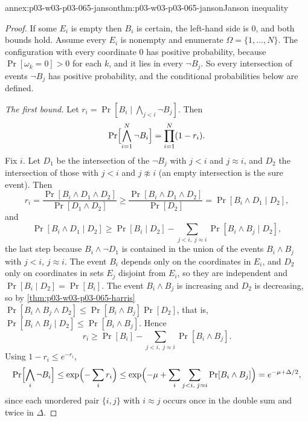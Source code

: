 \begin{annexitem}{annex:p03-w03-p03-065-janson}{thm:p03-w03-p03-065-janson}{Janson inequality}
\begin{proof}
If some \(E_i\) is empty then \(B_i\) is certain, the left-hand side is
\(0\), and both bounds hold.  Assume every \(E_i\) is nonempty and enumerate
\(\Omega=\{1,\ldots,N\}\).  The configuration with every coordinate \(0\)
has positive probability, because \(\Pr[\omega_k=0]>0\) for each \(k\), and
it lies in every \(\neg B_j\).  So every intersection of events \(\neg B_j\)
has positive probability, and the conditional probabilities below are
defined.

\emph{The first bound.}  Let \(r_i=\Pr[B_i\mid\bigwedge_{j<i}\neg B_j]\).
Then
\[
  \Pr\Bigl[\bigwedge_{i=1}^N\neg B_i\Bigr]=\prod_{i=1}^N(1-r_i).
\]
Fix \(i\).  Let \(D_1\) be the intersection of the \(\neg B_j\) with
\(j<i\) and \(j\approx i\), and \(D_2\) the intersection of those with \(j<i\)
and \(j\not\approx i\) (an empty intersection is the sure event).  Then
\[
  r_i=\frac{\Pr[B_i\wedge D_1\wedge D_2]}{\Pr[D_1\wedge D_2]}
  \geq\frac{\Pr[B_i\wedge D_1\wedge D_2]}{\Pr[D_2]}
  =\Pr[B_i\wedge D_1\mid D_2],
\]
and
\[
  \Pr[B_i\wedge D_1\mid D_2]
  \geq\Pr[B_i\mid D_2]-\sum_{j<i,\;j\approx i}\Pr[B_i\wedge B_j\mid D_2],
\]
the last step because \(B_i\wedge\neg D_1\) is contained in the union of the
events \(B_i\wedge B_j\) with \(j<i\), \(j\approx i\).  The event \(B_i\)
depends only on the coordinates in \(E_i\), and \(D_2\) only on coordinates
in sets \(E_j\) disjoint from \(E_i\), so they are independent and
\(\Pr[B_i\mid D_2]=\Pr[B_i]\).  The event \(B_i\wedge B_j\) is increasing and
\(D_2\) is decreasing, so by \cref{thm:p03-w03-p03-065-harris}
\(\Pr[B_i\wedge B_j\wedge D_2]\leq\Pr[B_i\wedge B_j]\Pr[D_2]\), that is,
\(\Pr[B_i\wedge B_j\mid D_2]\leq\Pr[B_i\wedge B_j]\).  Hence
\[
  r_i\geq\Pr[B_i]-\sum_{j<i,\;j\approx i}\Pr[B_i\wedge B_j].
\]
Using \(1-r_i\leq e^{-r_i}\),
\[
  \Pr\Bigl[\bigwedge_i\neg B_i\Bigr]\leq\exp\Bigl(-\sum_ir_i\Bigr)
  \leq\exp\Bigl(-\mu+\sum_i\sum_{j<i,\;j\approx i}\Pr[B_i\wedge B_j]\Bigr)
  =e^{-\mu+\Delta/2},
\]
since each unordered pair \(\{i,j\}\) with \(i\approx j\) occurs once in the
double sum and twice in \(\Delta\).


\end{proof}
\end{annexitem}
